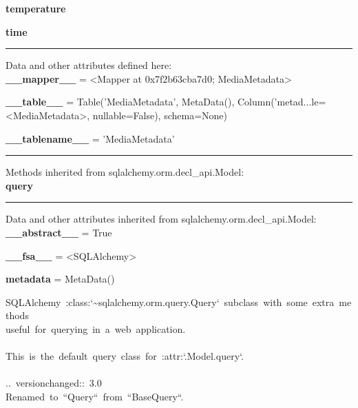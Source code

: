 \begin{longtable}[]
\begin{minipage}[t]{\linewidth}
\begin{longtable}[]
\begin{minipage}[t]{\linewidth}
\textbf{temperature}

\textbf{time}

\begin{center}\rule{0.5\linewidth}{0.5pt}\end{center}

Data and other attributes defined here:\\

\textbf{\_\_mapper\_\_} = \textless Mapper at 0x7f2b63cba7d0;
MediaMetadata\textgreater{}

\textbf{\_\_table\_\_} = Table('MediaMetadata', MetaData(),
Column('metad...le=\textless MediaMetadata\textgreater, nullable=False),
schema=None)

\textbf{\_\_tablename\_\_} = 'MediaMetadata'

\begin{center}\rule{0.5\linewidth}{0.5pt}\end{center}

Methods inherited from sqlalchemy.orm.decl\_api.Model:\\

\textbf{query}

\begin{center}\rule{0.5\linewidth}{0.5pt}\end{center}

Data and other attributes inherited from
sqlalchemy.orm.decl\_api.Model:\\

\textbf{\_\_abstract\_\_} = True

\textbf{\_\_fsa\_\_} = \textless SQLAlchemy\textgreater{}

\textbf{metadata} = MetaData()

\begin{description}
\tightlist
\item[\textbf{query\_class} = \textless class
'flask\_sqlalchemy.query.Query'\textgreater{}]
{SQLAlchemy~:class:`\textasciitilde sqlalchemy.orm.query.Query`~subclass~with~some~extra~methods\\
useful~for~querying~in~a~web~application.\\
\hspace*{0.333em}\\
This~is~the~default~query~class~for~:attr:`.Model.query`.\\
\hspace*{0.333em}\\
..~versionchanged::~3.0\\
\hspace*{0.333em}\hspace*{0.333em}\hspace*{0.333em}\hspace*{0.333em}Renamed~to~``Query``~from~``BaseQuery``.}
\end{description}


\end{minipage}
\end{longtable}
\end{minipage}
\end{longtable}

